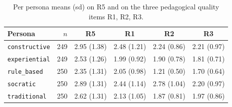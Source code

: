 \begin{table}[ht]
\centering\small
\caption{Per persona means (sd) on R5 and on the three pedagogical quality items R1, R2, R3.}
\label{tab:per-persona-means}
\begin{tabular}{lrcccc}
\toprule
Persona & $n$ & R5 & R1 & R2 & R3 \\
\midrule
\texttt{constructive} & 249 & 2.95 (1.38) & 2.48 (1.21) & 2.24 (0.86) & 2.21 (0.97) \\
\texttt{experiential} & 249 & 2.53 (1.26) & 1.99 (0.92) & 1.90 (0.78) & 1.81 (0.71) \\
\texttt{rule\_based} & 250 & 2.35 (1.31) & 2.05 (0.98) & 1.21 (0.50) & 1.70 (0.64) \\
\texttt{socratic} & 250 & 2.89 (1.31) & 2.44 (1.14) & 2.78 (1.04) & 2.20 (0.97) \\
\texttt{traditional} & 250 & 2.62 (1.31) & 2.13 (1.05) & 1.87 (0.81) & 1.97 (0.86) \\
\bottomrule
\end{tabular}
\end{table}
